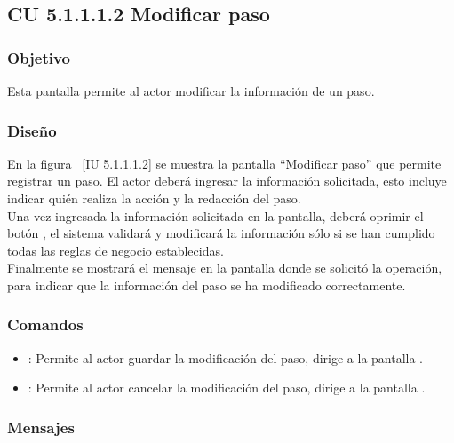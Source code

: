 \subsection{CU 5.1.1.1.2 Modificar paso}

\subsubsection{Objetivo}
	
	Esta pantalla permite al actor modificar la información de un paso.

\subsubsection{Diseño}

    En la figura ~\ref{IU 5.1.1.1.2} se muestra la pantalla ``Modificar paso'' que permite registrar un paso. El actor deberá ingresar la información solicitada, 
    esto incluye indicar quién realiza la acción y la redacción del paso.\\
    
    
    Una vez ingresada la información solicitada en la pantalla, deberá oprimir el botón 
    , el sistema validará y modificará la información sólo si se han cumplido todas las reglas de negocio establecidas.  \\
    
    Finalmente se mostrará el mensaje  en la pantalla donde se solicitó la operación,
    para indicar que la información del paso
    se ha modificado correctamente.        




\subsubsection{Comandos}
\begin{itemize}
	\item {}: Permite al actor guardar la modificación del paso, dirige a la pantalla .
	\item {}: Permite al actor cancelar la modificación del paso, dirige a la pantalla .
\end{itemize}

\subsubsection{Mensajes}

